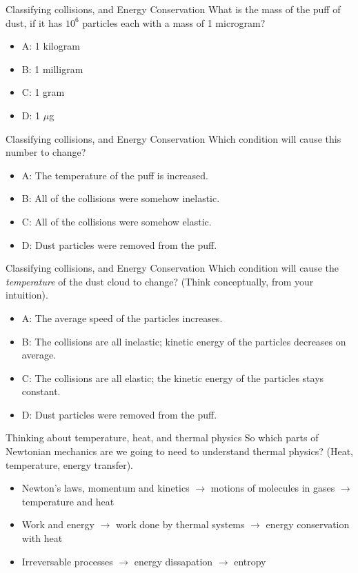 \documentclass{beamer}
\begin{document}
\begin{frame}{Classifying collisions, and Energy Conservation}
What is the mass of the puff of dust, if it has $10^6$ particles each with a mass of 1 microgram?  
\begin{itemize}
\item A: 1 kilogram
\item B: 1 milligram
\item C: 1 gram
\item D: 1 $\mu$g
\end{itemize}
\end{frame}

\begin{frame}{Classifying collisions, and Energy Conservation}
Which condition will cause this number to change?
\begin{itemize}
\item A: The temperature of the puff is increased.
\item B: All of the collisions were somehow inelastic.
\item C: All of the collisions were somehow elastic.
\item D: Dust particles were removed from the puff.
\end{itemize}
\end{frame}

\begin{frame}{Classifying collisions, and Energy Conservation}
Which condition will cause the \textit{temperature} of the dust cloud to change?  (Think conceptually, from your intuition).
\begin{itemize}
\item A: The average speed of the particles increases.
\item B: The collisions are all inelastic; kinetic energy of the particles decreases on average.
\item C: The collisions are all elastic; the kinetic energy of the particles stays constant.
\item D: Dust particles were removed from the puff.
\end{itemize}
\end{frame}

\begin{frame}{Thinking about temperature, heat, and thermal physics}
So which parts of Newtonian mechanics are we going to need to understand thermal physics? (Heat, temperature, energy transfer).
\begin{itemize}
\item Newton's laws, momentum and kinetics $\rightarrow$ motions of molecules in gases $\rightarrow$ temperature and heat
\item Work and energy $\rightarrow$ work done by thermal systems $\rightarrow$ energy conservation with heat
\item Irreversable processes $\rightarrow$ energy dissapation $\rightarrow$ entropy
\end{itemize}
\end{frame}
\end{document}
